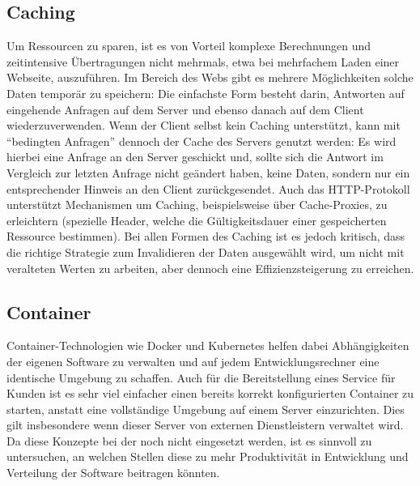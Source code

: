 \subsection{Caching}
Um Ressourcen zu sparen, ist es von Vorteil komplexe Berechnungen und zeitintensive Übertragungen nicht mehrmals, etwa bei mehrfachem Laden einer Webseite, auszuführen. Im Bereich des Webs gibt es mehrere Möglichkeiten solche Daten temporär zu speichern: Die einfachste Form besteht darin, Antworten auf eingehende Anfragen auf dem Server und ebenso danach auf dem Client wiederzuverwenden. Wenn der Client selbst kein Caching unterstützt, kann mit ``bedingten Anfragen'' dennoch der Cache des Servers genutzt werden: Es wird hierbei eine Anfrage an den Server geschickt und, sollte sich die Antwort im Vergleich zur letzten Anfrage nicht geändert haben, keine Daten, sondern nur ein entsprechender Hinweis an den Client zurückgesendet. Auch das HTTP-Protokoll unterstützt Mechanismen um Caching, beispielsweise über Cache-Proxies, zu erleichtern (spezielle Header, welche die Gültigkeitsdauer einer gespeicherten Ressource bestimmen). Bei allen Formen des Caching ist es jedoch kritisch, dass die richtige Strategie zum Invalidieren der Daten ausgewählt wird, um nicht mit veralteten Werten zu arbeiten, aber dennoch eine Effizienzsteigerung zu erreichen.

\subsection{Container}
Container-Technologien wie Docker und Kubernetes helfen dabei Abhängigkeiten der eigenen Software zu verwalten und auf jedem Entwicklungsrechner eine identische Umgebung zu schaffen. Auch für die Bereitstellung eines Service für Kunden ist es sehr viel einfacher einen bereits korrekt konfigurierten Container zu starten, anstatt eine vollständige Umgebung auf einem Server einzurichten. Dies gilt insbesondere wenn dieser Server von externen Dienstleistern verwaltet wird. Da diese Konzepte bei der  noch nicht eingesetzt werden, ist es sinnvoll zu untersuchen, an welchen Stellen diese zu mehr Produktivität in Entwicklung und Verteilung der Software beitragen könnten.

